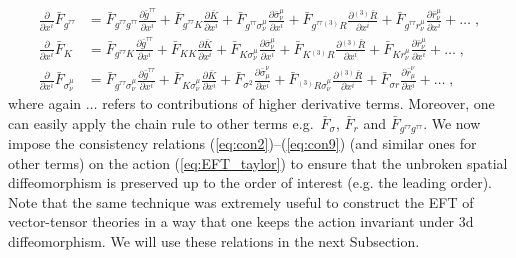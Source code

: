 \documentclass[a4paper,11pt]{article}
\numberwithin{equation}{section}
\begin{document}
\begin{align}
 \frac{\partial}{\partial x^i} \bar{F}_{g^{\tau\tau}} &= \bar{F}_{g^{\tau\tau}g^{\tau\tau}}\frac{\partial \bar{g}^{\tau\tau}}{\partial x^i} + \bar{F}_{g^{\tau\tau}K}\frac{\partial \bar{K}}{\partial x^i} + \bar{F}_{g^{\tau\tau}\sigma^\mu_\nu}\frac{\partial \bar{\sigma}^\mu_\nu}{\partial x^i} + \bar{F}_{g^{\tau\tau}{}^{(3)}\!R} \frac{\partial {}^{(3)}\!\bar{R} }{\partial x^i}+ \bar{F}_{g^{\tau\tau}r^\mu_\nu}\frac{\partial \bar{r}^\mu_\nu}{\partial x^i} + \ldots \;, \label{eq:con4}\\
\frac{\partial}{\partial x^i}\bar{F}_{K} &= \bar{F}_{g^{\tau\tau}K}\frac{\partial \bar{g}^{\tau\tau}}{\partial x^i} + \bar{F}_{KK}\frac{\partial \bar{K}}{\partial x^i} + \bar{F}_{K\sigma^\mu_\nu}\frac{\partial \bar{\sigma}^\mu_\nu}{\partial x^i}  + \bar{F}_{K{}^{(3)}\!R}\frac{\partial {}^{(3)}\!\bar{R}}{\partial x^i} + \bar{F}_{K r^\mu_\nu} \frac{\partial \bar{r}^\mu_\nu}{\partial x^i} +  \ldots \;, \label{eq:con6} \\
\frac{\partial}{\partial x^i}\bar{F}_{\sigma^\mu_\nu} &= \bar{F}_{g^{\tau\tau} \sigma^\mu_\nu} \frac{\partial \bar{g}^{\tau\tau}}{\partial x^i} + \bar{F}_{K \sigma^\mu_\nu} \frac{\partial \bar{K} }{\partial x^i} + \bar{F}_{\sigma^2} \frac{\partial  \bar{\sigma}_\mu^\nu}{\partial x^i} + \bar{F}_{{}^{(3)}\!R \sigma^\mu_\nu} \frac{\partial {}^{(3)}\!\bar{R}}{\partial x^i} + \bar{F}_{\sigma r} \frac{\partial \bar{r}^\nu_\mu}{\partial x^i}  + \ldots \;,  \label{eq:con9}  
\end{align}
where again $\ldots$ refers to contributions of higher derivative terms. Moreover, one can easily apply the chain rule to other terms e.g.~$\bar{F}_{\sigma}$, $\bar{F}_{r}$ and $\bar{F}_{g^{\tau\tau}g^{\tau\tau}}$. We now impose the consistency relations (\ref{eq:con2})--(\ref{eq:con9}) (and similar ones for other terms) on the action (\ref{eq:EFT_taylor}) to ensure that the unbroken spatial diffeomorphism is preserved up to the order of interest (e.g. the leading order). Note that the same technique was extremely useful to construct the EFT of vector-tensor theories \cite{Aoki:2021wew} in a way that one keeps the action invariant under 3d diffeomorphism.  We will use these relations in the next Subsection.
\end{document}
